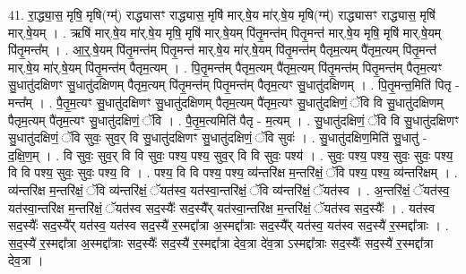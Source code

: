 \documentclass[17pt]{extarticle}
\begin{document}
41. रा॒द्ध्या॒स॒ मृषि॒ मृषि(ग्म्॑) राद्ध्यासꣳ राद्ध्यास॒ मृषि॑ मार्.षे॒य मा॑र्.षे॒य मृषि(ग्म्॑) राद्ध्यासꣳ राद्ध्यास॒ मृषि॑ मार्.षे॒यम् । . ऋषि॑ मार्.षे॒य मा॑र्.षे॒य मृषि॒ मृषि॑ मार्.षे॒यम् पि॑तृ॒मन्त॑म् पितृ॒मन्त॑ मार्.षे॒य मृषि॒ मृषि॑ मार्.षे॒यम् पि॑तृ॒मन्त᳚म् । . आ॒र्॒.षे॒यम् पि॑तृ॒मन्त॑म् पितृ॒मन्त॑ मार्.षे॒य मा॑र्.षे॒यम् पि॑तृ॒मन्त॑म् पैतृम॒त्यम् पै॑तृम॒त्यम् पि॑तृ॒मन्त॑ मार्.षे॒य मा॑र्.षे॒यम् पि॑तृ॒मन्त॑म् पैतृम॒त्यम् । . पि॒तृ॒मन्त॑म् पैतृम॒त्यम् पै॑तृम॒त्यम् पि॑तृ॒मन्त॑म् पितृ॒मन्त॑म् पैतृम॒त्यꣳ सु॒धातु॑दक्षिणꣳ सु॒धातु॑दक्षिणम् पैतृम॒त्यम् पि॑तृ॒मन्त॑म् पितृ॒मन्त॑म् पैतृम॒त्यꣳ सु॒धातु॑दक्षिणम् । . पि॒तृ॒मन्त॒मिति॑ पितृ - मन्त᳚म् । . पै॒तृ॒म॒त्यꣳ सु॒धातु॑दक्षिणꣳ सु॒धातु॑दक्षिणम् पैतृम॒त्यम् पै॑तृम॒त्यꣳ सु॒धातु॑दक्षिणं॒ ॅवि वि सु॒धातु॑दक्षिणम् पैतृम॒त्यम् पै॑तृम॒त्यꣳ सु॒धातु॑दक्षिणं॒ ॅवि । . पै॒तृ॒म॒त्यमिति॑ पैतृ - म॒त्यम् । . सु॒धातु॑दक्षिणं॒ ॅवि वि सु॒धातु॑दक्षिणꣳ सु॒धातु॑दक्षिणं॒ ॅवि सुवः॒ सुव॒र् वि सु॒धातु॑दक्षिणꣳ सु॒धातु॑दक्षिणं॒ ॅवि सुवः॑ । . सु॒धातु॑दक्षिण॒मिति॑ सु॒धातु॑ - द॒क्षि॒ण॒म् । . वि सुवः॒ सुव॒र् वि वि सुवः॒ पश्य॒ पश्य॒ सुव॒र् वि वि सुवः॒ पश्य॑ । . सुवः॒ पश्य॒ पश्य॒ सुवः॒ सुवः॒ पश्य॒ वि वि पश्य॒ सुवः॒ सुवः॒ पश्य॒ वि । . पश्य॒ वि वि पश्य॒ पश्य॒ व्य॑न्तरि॑क्ष म॒न्तरि॑क्षं॒ ॅवि पश्य॒ पश्य॒ व्य॑न्तरि॑क्षम् । . व्य॑न्तरि॑क्ष म॒न्तरि॑क्षं॒ ॅवि व्य॑न्तरि॑क्षं॒ ॅयत॑स्व॒ यत॑स्वा॒न्तरि॑क्षं॒ ॅवि व्य॑न्तरि॑क्षं॒ ॅयत॑स्व । . अ॒न्तरि॑क्षं॒ ॅयत॑स्व॒ यत॑स्वा॒न्तरि॑क्ष म॒न्तरि॑क्षं॒ ॅयत॑स्व सद॒स्यैः᳚ सद॒स्यै᳚र् यत॑स्वा॒न्तरि॑क्ष म॒न्तरि॑क्षं॒ ॅयत॑स्व सद॒स्यैः᳚ । . यत॑स्व सद॒स्यैः᳚ सद॒स्यै᳚र् यत॑स्व॒ यत॑स्व सद॒स्यै॑ र॒स्मद्दा᳚त्रा अ॒स्मद्दा᳚त्राः सद॒स्यै᳚र् यत॑स्व॒ यत॑स्व सद॒स्यै॑ र॒स्मद्दा᳚त्राः । . स॒द॒स्यै॑ र॒स्मद्दा᳚त्रा अ॒स्मद्दा᳚त्राः सद॒स्यैः᳚ सद॒स्यै॑ र॒स्मद्दा᳚त्रा देव॒त्रा दे॑व॒त्रा ऽस्मद्दा᳚त्राः सद॒स्यैः᳚ सद॒स्यै॑ र॒स्मद्दा᳚त्रा देव॒त्रा । \newline
\end{document}
